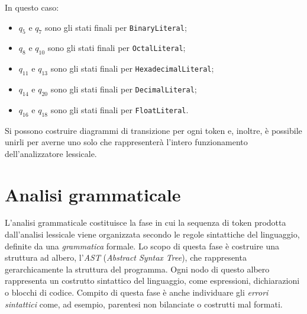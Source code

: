 In questo caso:
\begin{itemize}
	\item $q_5$ e $q_7$ sono gli stati finali per \texttt{BinaryLiteral};
	\item $q_8$ e $q_{10}$ sono gli stati finali per \texttt{OctalLiteral};
	\item $q_{11}$ e $q_{13}$ sono gli stati finali per \texttt{HexadecimalLiteral};
	\item $q_{14}$ e $q_{20}$ sono gli stati finali per \texttt{DecimalLiteral};
	\item $q_{16}$ e $q_{18}$ sono gli stati finali per \texttt{FloatLiteral}.
\end{itemize}

Si possono costruire diagrammi di transizione per ogni token e, inoltre, \`e possibile unirli per averne uno solo che rappresenter\`a l'intero funzionamento dell'analizzatore lessicale.

\section{Analisi grammaticale}
\label{sec:analisi-grammaticale}

L'analisi grammaticale costituisce la fase in cui la sequenza di token prodotta dall'analisi lessicale viene organizzata secondo le regole sintattiche del linguaggio, definite da una \emph{grammatica} formale. Lo scopo di questa fase \`e costruire una struttura ad albero, l'\emph{AST} (\textit{Abstract Syntax Tree}), che rappresenta gerarchicamente la struttura del programma. Ogni nodo di questo albero rappresenta un costrutto sintattico del linguaggio, come espressioni, dichiarazioni o blocchi di codice. Compito di questa fase \`e anche individuare gli \emph{errori sintattici} come, ad esempio, parentesi non bilanciate o costrutti mal formati.

